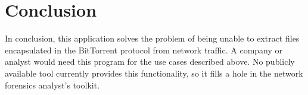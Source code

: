 \documentclass{acm_proc_article-sp}
\begin{document}
\section{Conclusion}
In conclusion, this application solves the problem of being unable to extract
files encapsulated in the BitTorrent protocol from network traffic.  A company
or analyst would need this program for the use cases described above.  No
publicly available tool currently provides this functionality, so it fills a
hole in the network forensics analyst's toolkit.

%
%
\end{document}
